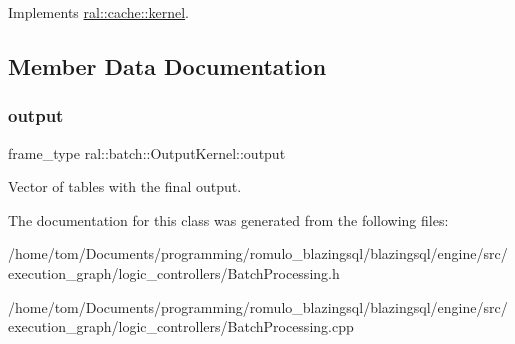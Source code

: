 Implements \hyperlink{classral_1_1cache_1_1kernel_a735b081cccae9574924e74ea6d293ef7}{ral\+::cache\+::kernel}.



\subsection{Member Data Documentation}
\mbox{\label{classral_1_1batch_1_1OutputKernel_a7dc0969924e0203fc30d9efa0063ddef}} 
\subsubsection{\texorpdfstring{output}{output}}
{\footnotesize\ttfamily frame\+\_\+type ral\+::batch\+::\+Output\+Kernel\+::output\hspace{0.3cm}{\ttfamily [protected]}}

Vector of tables with the final output. 

The documentation for this class was generated from the following files\+:\begin{DoxyCompactItemize}
\item 
/home/tom/\+Documents/programming/romulo\+\_\+blazingsql/blazingsql/engine/src/execution\+\_\+graph/logic\+\_\+controllers/Batch\+Processing.\+h\item 
/home/tom/\+Documents/programming/romulo\+\_\+blazingsql/blazingsql/engine/src/execution\+\_\+graph/logic\+\_\+controllers/Batch\+Processing.\+cpp\end{DoxyCompactItemize}
